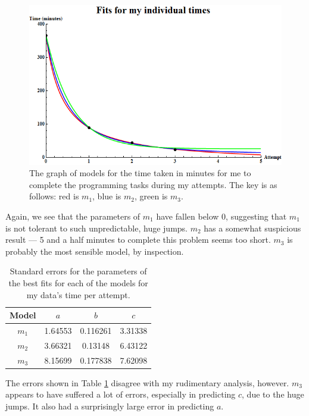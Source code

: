 \begin{figure}[ht!]
\centering
\includegraphics[scale=0.65]{./media/MyTimesGraph.png}
\caption{The graph of models for the time taken in minutes for me to complete the programming tasks
	during my attempts. The key is as follows:
		 red is $m_1$,
		 blue is $m_2$,
		 green is $m_3$.
}
	\label{figure:mytimes:abc}
\end{figure}

Again, we see that the parameters of $m_1$ have fallen below 0, suggesting that
$m_1$ is not tolerant to such unpredictable, huge jumps.
$m_2$ has a somewhat suspicious result --- 5 and a half minutes to complete this
problem seems too short.
$m_3$ is probably the most sensible model, by inspection.

\begin{table}[ht!]
\centering
\begin{tabular}{|c|c|c|c|}
\hline
{\bf Model} &  $a$ & $b$ & $c$ \\
\hline
$m_1$ & 1.64553 & 0.116261 & 3.31338 \\
\hline
$m_2$ & 3.66321 & 0.13148 & 6.43122 \\
\hline
$m_3$ & 8.15699 & 0.177838 & 7.62098 \\
\hline
\end{tabular}
\caption{Standard errors for the parameters of the best fits for each of the
  models for my data's time per attempt.}
\label{table:mytimes:abc:error}
\end{table}

The errors shown in Table \ref{table:mytimes:abc:error} disagree with my
rudimentary analysis, however.
$m_3$ appears to have suffered a lot of errors, especially in predicting $c$,
due to the huge jumps.
It also had a surprisingly large error in predicting $a$.

